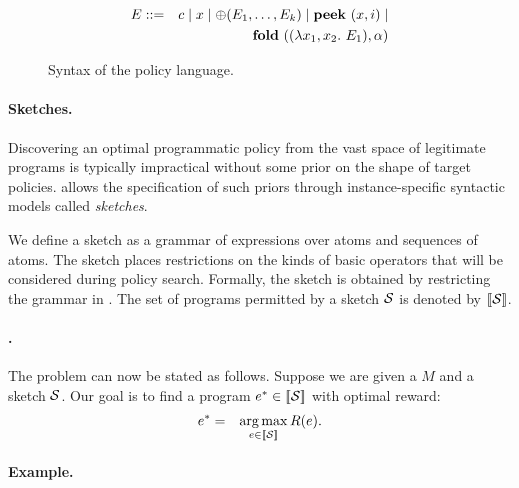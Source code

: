 \begin{figure}
{\small
\begin{eqnarray*}
E & ::= & c \mid x \mid \op(E_1,\dots, E_k) \mid \pickc~(\alphac, i) \mid \\& & 
\foldc~((\lambda x_1, x_2.~E_1),\alpha) 
\\
\end{eqnarray*}
}
\vspace{-0.3in}
\caption{Syntax of the policy language.}
\label{fig:syntax}
\vspace{-0.1in}
\end{figure}

\paragraph{Sketches.} 

Discovering an optimal programmatic policy from the vast space of legitimate programs is typically impractical without some prior on the shape of target policies. \sygurl allows the specification of such priors through instance-specific syntactic models called {\em sketches}. 

We define a sketch as a grammar of expressions over atoms and
sequences of atoms. The sketch places restrictions on the kinds of basic operators that will be considered during policy search. Formally, the sketch is obtained by restricting the grammar in
. The set of programs permitted by a
sketch $\S$ is denoted by $\sem{\S}$.

\paragraph{\sygurl.}

The \sygurl problem can now be stated as follows. Suppose we are given a \pomdp $M$ and a sketch $\S$. Our goal is to find a {program} $e^* \in \sem{\S}$ 
with optimal reward:
\begin{eqnarray}
\label{eq:synthesis}
e^* &= &  \argmax_{e \in \sem{\S}} R(e).
\end{eqnarray}

\paragraph{Example.}

